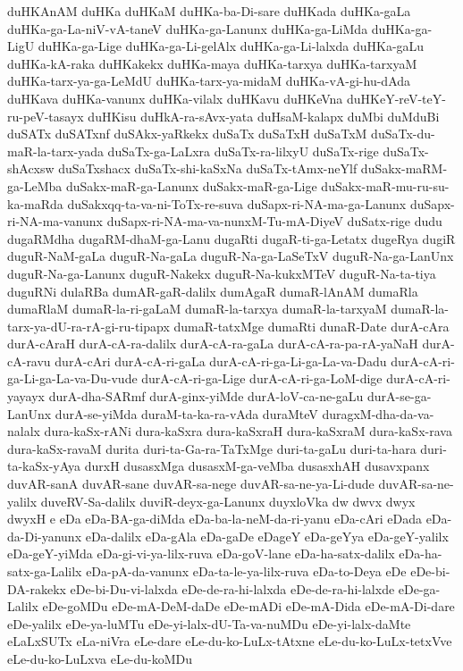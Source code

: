 {duHKAnAM
duHKa
duHKaM
duHKa-ba-Di-sare
duHKada
duHKa-gaLa
duHKa-ga-La-niV-vA-taneV
duHKa-ga-Lanunx
duHKa-ga-LiMda
duHKa-ga-LigU
duHKa-ga-Lige
duHKa-ga-Li-gelAlx
duHKa-ga-Li-lalxda
duHKa-gaLu
duHKa-kA-raka
duHKakekx
duHKa-maya
duHKa-tarxya
duHKa-tarxyaM
duHKa-tarx-ya-ga-LeMdU
duHKa-tarx-ya-midaM
duHKa-vA-gi-hu-dAda
duHKava
duHKa-vanunx
duHKa-vilalx
duHKavu
duHKeVna
duHKeY-reV-teY-ru-peV-tasayx
duHKisu
duHkA-ra-sAvx-yata
duHsaM-kalapx
duMbi
duMduBi
duSATx
duSATxnf
duSAkx-yaRkekx
duSaTx
duSaTxH
duSaTxM
duSaTx-du-maR-la-tarx-yada
duSaTx-ga-LaLxra
duSaTx-ra-lilxyU
duSaTx-rige
duSaTx-shAcxsw
duSaTxshacx
duSaTx-shi-kaSxNa
duSaTx-tAmx-neYlf
duSakx-maRM-ga-LeMba
duSakx-maR-ga-Lanunx
duSakx-maR-ga-Lige
duSakx-maR-mu-ru-su-ka-maRda
duSakxqq-ta-va-ni-ToTx-re-suva
duSapx-ri-NA-ma-ga-Lanunx
duSapx-ri-NA-ma-vanunx
duSapx-ri-NA-ma-va-nunxM-Tu-mA-DiyeV
duSatx-rige
dudu
dugaRMdha
dugaRM-dhaM-ga-Lanu
dugaRti
dugaR-ti-ga-Letatx
dugeRya
dugiR
duguR-NaM-gaLa
duguR-Na-gaLa
duguR-Na-ga-LaSeTxV
duguR-Na-ga-LanUnx
duguR-Na-ga-Lanunx
duguR-Nakekx
duguR-Na-kukxMTeV
duguR-Na-ta-tiya
duguRNi
dulaRBa
dumAR-gaR-dalilx
dumAgaR
dumaR-lAnAM
dumaRla
dumaRlaM
dumaR-la-ri-gaLaM
dumaR-la-tarxya
dumaR-la-tarxyaM
dumaR-la-tarx-ya-dU-ra-rA-gi-ru-tipapx
dumaR-tatxMge
dumaRti
dunaR-Date
durA-cAra
durA-cAraH
durA-cA-ra-dalilx
durA-cA-ra-gaLa
durA-cA-ra-pa-rA-yaNaH
durA-cA-ravu
durA-cAri
durA-cA-ri-gaLa
durA-cA-ri-ga-Li-ga-La-va-Dadu
durA-cA-ri-ga-Li-ga-La-va-Du-vude
durA-cA-ri-ga-Lige
durA-cA-ri-ga-LoM-dige
durA-cA-ri-yayayx
durA-dha-SARmf
durA-ginx-yiMde
durA-loV-ca-ne-gaLu
durA-se-ga-LanUnx
durA-se-yiMda
duraM-ta-ka-ra-vAda
duraMteV
duragxM-dha-da-va-nalalx
dura-kaSx-rANi
dura-kaSxra
dura-kaSxraH
dura-kaSxraM
dura-kaSx-rava
dura-kaSx-ravaM
durita
duri-ta-Ga-ra-TaTxMge
duri-ta-gaLu
duri-ta-hara
duri-ta-kaSx-yAya
durxH
dusasxMga
dusasxM-ga-veMba
dusasxhAH
dusavxpanx
duvAR-sanA
duvAR-sane
duvAR-sa-nege
duvAR-sa-ne-ya-Li-dude
duvAR-sa-ne-yalilx
duveRV-Sa-dalilx
duviR-deyx-ga-Lanunx
duyxloVka
dw
dwvx
dwyx
dwyxH
e
eDa
eDa-BA-ga-diMda
eDa-ba-la-neM-da-ri-yanu
eDa-cAri
eDada
eDa-da-Di-yanunx
eDa-dalilx
eDa-gAla
eDa-gaDe
eDageY
eDa-geYya
eDa-geY-yalilx
eDa-geY-yiMda
eDa-gi-vi-ya-lilx-ruva
eDa-goV-lane
eDa-ha-satx-dalilx
eDa-ha-satx-ga-Lalilx
eDa-pA-da-vanunx
eDa-ta-le-ya-lilx-ruva
eDa-to-Deya
eDe
eDe-bi-DA-rakekx
eDe-bi-Du-vi-lalxda
eDe-de-ra-hi-lalxda
eDe-de-ra-hi-lalxde
eDe-ga-Lalilx
eDe-goMDu
eDe-mA-DeM-daDe
eDe-mADi
eDe-mA-Dida
eDe-mA-Di-dare
eDe-yalilx
eDe-ya-luMTu
eDe-yi-lalx-dU-Ta-va-nuMDu
eDe-yi-lalx-daMte
eLaLxSUTx
eLa-niVra
eLe-dare
eLe-du-ko-LuLx-tAtxne
eLe-du-ko-LuLx-tetxVve
eLe-du-ko-LuLxva
eLe-du-koMDu
}

